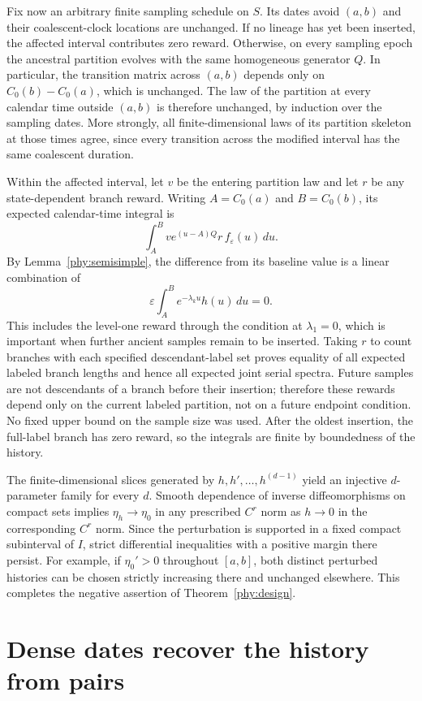 \documentclass[11pt]{article}
\theoremstyle{definition}
\theoremstyle{remark}
\numberwithin{equation}{section}
\begin{document}
Fix now an arbitrary finite sampling schedule on $S$. Its dates
avoid $(a,b)$ and their coalescent-clock locations are unchanged.
If no lineage has yet been inserted, the affected interval contributes
zero reward. Otherwise, on every sampling epoch the ancestral partition evolves with the
same homogeneous generator $Q$. In particular, the transition
matrix across $(a,b)$ depends only on
$C_0(b)-C_0(a)$, which is unchanged. The law of the partition at
every calendar time outside $(a,b)$ is therefore unchanged, by
induction over the sampling dates. More strongly, all finite-dimensional
laws of its partition skeleton at those times agree, since every
transition across the modified interval has the same coalescent duration.

Within the affected interval, let $v$ be the entering partition law
and let $r$ be any state-dependent branch reward. Writing
$A=C_0(a)$ and $B=C_0(b)$, its expected calendar-time integral is
\[
 \int_A^B v e^{(u-A)Q}r\,f_\varepsilon(u)\,du.
\]
By Lemma~\ref{phy:semisimple}, the difference from its baseline value
is a linear combination of
\[
             \varepsilon\int_A^B e^{-\lambda_k u}h(u)\,du=0.
\]
This includes the level-one reward through the condition at
$\lambda_1=0$, which is important when further ancient samples
remain to be inserted. Taking $r$ to count branches with each
specified descendant-label set proves equality of all expected
labeled branch lengths and hence all expected joint serial spectra.
Future samples are not descendants of a branch before their insertion;
therefore these rewards depend only on the current labeled partition,
not on a future endpoint condition. No fixed upper bound on the sample
size was used. After the oldest insertion, the full-label branch has zero
reward, so the integrals are finite by boundedness of the history.

The finite-dimensional slices generated by
$h,h',\ldots,h^{(d-1)}$ yield an injective $d$-parameter family for
every $d$. Smooth dependence of inverse diffeomorphisms on compact
sets implies $\eta_h\to\eta_0$ in any prescribed $C^r$ norm as
$h\to0$ in the corresponding $C^r$ norm. Since the perturbation is
supported in a fixed compact subinterval of $I$, strict differential
inequalities with a positive margin there persist. For example,
if $\eta_0'>0$ throughout $[a,b]$, both distinct perturbed histories
can be chosen strictly increasing there and unchanged elsewhere.
This completes the negative assertion of Theorem~\ref{phy:design}.

\section{Dense dates recover the history from pairs}
\label{sec:dense}
\end{document}
